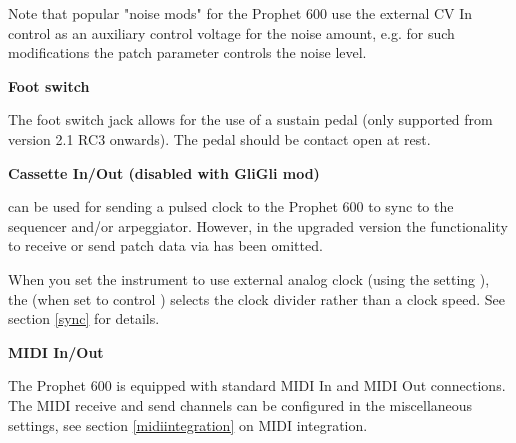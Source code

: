 Note that popular "noise mods" for the Prophet 600 use the external CV In control as an auxiliary control voltage for the noise amount, e.g. for such modifications the patch parameter controls the noise level.

\textbf{Foot switch}

The foot switch jack allows for the use of a sustain pedal (only supported from version 2.1 RC3 onwards). The pedal should be contact open at rest.

\textbf{Cassette In/Out (disabled with GliGli mod)}

\cassettein can be used for sending a pulsed clock to the Prophet 600 to sync to the sequencer and/or arpeggiator. However, in the upgraded version the functionality to receive or send patch data via \cassettein has been omitted. 

When you set the instrument to use external analog clock (using the setting \clocksync), the \datadial (when set to control \clock) selects the clock divider rather than a clock speed. See section \ref{sync} for details.

\textbf{MIDI In/Out}

The Prophet 600 is equipped with standard MIDI In and MIDI Out connections. The MIDI receive and send channels can be configured in the miscellaneous settings, see section \ref{midiintegration} on MIDI integration.  
